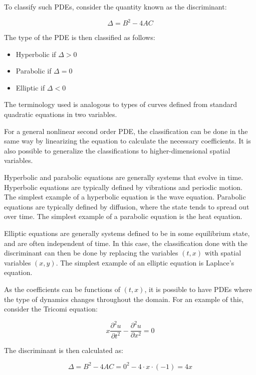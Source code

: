 To classify such PDEs, consider the quantity known as the discriminant:

\begin{equation}
    \Delta = B^2 - 4 A C
\end{equation}

The type of the PDE is then classified as follows:

\begin{itemize}
    \item Hyperbolic if $\Delta > 0$
    \item Parabolic if $\Delta = 0$
    \item Elliptic if $\Delta < 0$
\end{itemize}

The terminology used is analogous to types of curves defined from standard quadratic equations in two variables.

For a general nonlinear second order PDE, the classification can be done in the same way by linearizing the equation to calculate the necessary coefficients. It is also possible to generalize the classifications to higher-dimensional spatial variables.

Hyperbolic and parabolic equations are generally systems that evolve in time. Hyperbolic equations are typically defined by vibrations and periodic motion. The simplest example of a hyperbolic equation is the wave equation. Parabolic equations are typically defined by diffusion, where the state tends to spread out over time. The simplest example of a parabolic equation is the heat equation.

Elliptic equations are generally systems defined to be in some equilibrium state, and are often independent of time. In this case, the classification done with the discriminant can then be done by replacing the variables $(t, x)$ with spatial variables $(x, y)$. The simplest example of an elliptic equation is Laplace's equation.

As the coefficients can be functions of $(t, x)$, it is possible to have PDEs where the type of dynamics changes throughout the domain. For an example of this, consider the Tricomi equation:

\begin{equation}
    x \frac{\partial^2 u}{\partial t^2} - \frac{\partial^2 u}{\partial x^2} = 0
\end{equation}

The discriminant is then calculated as:

\begin{equation}
    \Delta = B^2 - 4 A C = 0^2 - 4 \cdot x \cdot (-1) = 4 x
\end{equation}

